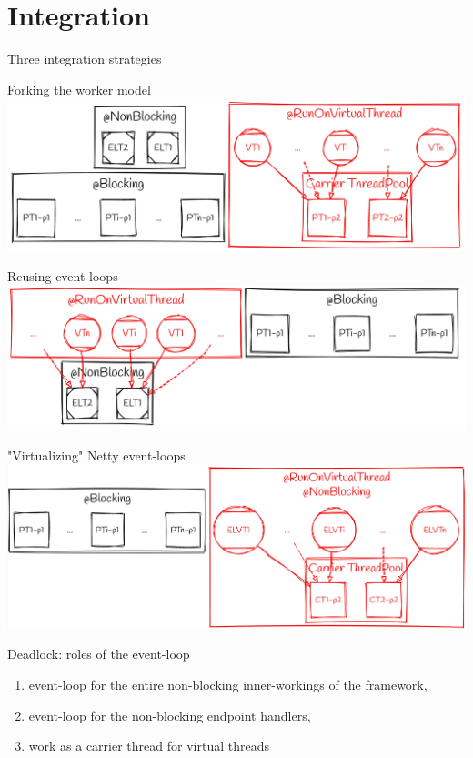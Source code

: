 \documentclass{beamer}
\begin{document}
\section{Integration}
\begin{frame}{Three integration strategies}
    
\end{frame}
\begin{frame}{Forking the worker model}
    \includegraphics[width=\textwidth]{assets/forking_workers.png}
\end{frame}
\begin{frame}{Reusing event-loops}
    \includegraphics[width=\textwidth]{assets/el_ct.png}
\end{frame}
\begin{frame}{"Virtualizing" Netty event-loops}
    \includegraphics[width=\textwidth]{assets/vt_el.png}
\end{frame}
\begin{frame}{Deadlock: roles of the event-loop}
    \begin{enumerate}
        \item event-loop for the entire non-blocking inner-workings of the framework, 
        \item event-loop for the non-blocking endpoint handlers,
        \item work as a carrier thread for virtual threads
    \end{enumerate}
\end{frame}
\end{document}
